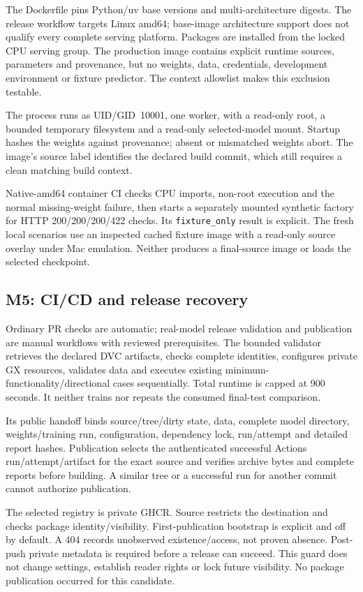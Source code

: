 \documentclass[a4paper,11pt]{article}
\begin{document}
The Dockerfile pins Python/uv base versions and multi-architecture digests. The
release workflow targets Linux amd64; base-image architecture support does not
qualify every complete serving platform. Packages are installed from the locked
CPU serving group. The production image contains explicit runtime sources,
parameters and provenance, but no weights, data, credentials, development
environment or fixture predictor. The context allowlist makes this exclusion
testable.

The process runs as UID/GID~10001, one worker, with a read-only root, a bounded
temporary filesystem and a read-only selected-model mount. Startup hashes the
weights against provenance; absent or mismatched weights abort. The image's
source label identifies the declared build commit, which still requires a clean
matching build context.

Native-amd64 container CI checks CPU imports, non-root execution and the normal
missing-weight failure, then starts a separately mounted synthetic factory for
HTTP 200/200/200/422 checks. Its \texttt{fixture\_only} result is explicit. The
fresh local scenarios use an inspected cached fixture image with a read-only
source overlay under Mac emulation. Neither produces a final-source image or
loads the selected checkpoint.

\subsection{M5: CI/CD and release recovery}

Ordinary PR checks are automatic; real-model release validation and publication
are manual workflows with reviewed prerequisites. The bounded validator retrieves
the declared DVC artifacts, checks complete identities, configures private GX
resources, validates data and executes existing minimum-functionality/directional
cases sequentially. Total runtime is capped at 900 seconds. It neither trains nor
repeats the consumed final-test comparison.

Its public handoff binds source/tree/dirty state, data, complete model directory,
weights/training run, configuration, dependency lock, run/attempt and detailed
report hashes. Publication selects the authenticated successful Actions
run/attempt/artifact for the exact source and verifies archive bytes and complete
reports before building. A similar tree or a successful run for another commit
cannot authorize publication.

The selected registry is private GHCR. Source restricts the destination and
checks package identity/visibility. First-publication bootstrap is explicit and
off by default. A 404 records unobserved existence/access, not proven absence.
Post-push private metadata is required before a release can succeed. This guard
does not change settings, establish reader rights or lock future visibility.
No package publication occurred for this candidate.
\end{document}
